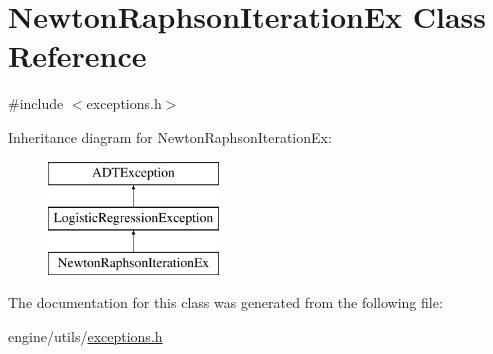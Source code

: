 \hypertarget{classNewtonRaphsonIterationEx}{
\section{NewtonRaphsonIterationEx Class Reference}
\label{classNewtonRaphsonIterationEx}
}


{\ttfamily \#include $<$exceptions.h$>$}

Inheritance diagram for NewtonRaphsonIterationEx:\begin{figure}[H]
\begin{center}
\leavevmode
\includegraphics[height=3cm]{classNewtonRaphsonIterationEx}
\end{center}
\end{figure}


The documentation for this class was generated from the following file:\begin{DoxyCompactItemize}
\item 
engine/utils/\hyperlink{exceptions_8h}{exceptions.h}\end{DoxyCompactItemize}
